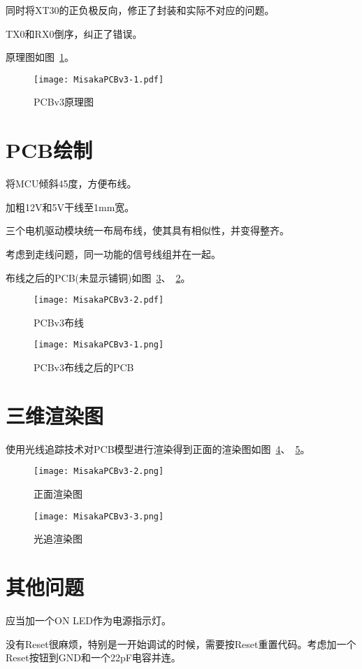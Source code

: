 同时将XT30的正负极反向，修正了封装和实际不对应的问题。

TX0和RX0倒序，纠正了错误。

原理图如图~\ref{fig:MisakaPCBv3-sch}。

\begin{figure}[htbp]
    \centering
    \texttt{[image: MisakaPCBv3-1.pdf]}
    \caption{PCBv3原理图}
    \label{fig:MisakaPCBv3-sch}
\end{figure}

\section{PCB绘制}

将MCU倾斜45度，方便布线。

加粗12V和5V干线至1mm宽。

三个电机驱动模块统一布局布线，使其具有相似性，并变得整齐。

考虑到走线问题，同一功能的信号线组并在一起。


布线之后的PCB(未显示铺铜)如图~\ref{fig:MisakaPCBv3-1}、~\ref{fig:MisakaPCBv3}。

\begin{figure}[htbp]
    \centering
    \texttt{[image: MisakaPCBv3-2.pdf]}
    \caption{PCBv3布线}
    \label{fig:MisakaPCBv3}
\end{figure}

\begin{figure}[htbp]
    \centering
    \texttt{[image: MisakaPCBv3-1.png]}
    \caption{PCBv3布线之后的PCB}
    \label{fig:MisakaPCBv3-1}
\end{figure}

\section{三维渲染图}

使用光线追踪技术对PCB模型进行渲染得到正面的渲染图如图~\ref{fig:MisakaPCBv3-2}、~\ref{fig:MisakaPCBv3-3}。

\begin{figure}[htbp]
    \centering
    \texttt{[image: MisakaPCBv3-2.png]}
    \caption{正面渲染图}
    \label{fig:MisakaPCBv3-2}
\end{figure}

\begin{figure}[htbp]
    \centering
    \texttt{[image: MisakaPCBv3-3.png]}
    \caption{光追渲染图}
    \label{fig:MisakaPCBv3-3}
\end{figure}

\section{其他问题}

应当加一个ON LED作为电源指示灯。

没有Reset很麻烦，特别是一开始调试的时候，需要按Reset重置代码。考虑加一个Reset按钮到GND和一个22pF电容并连。
